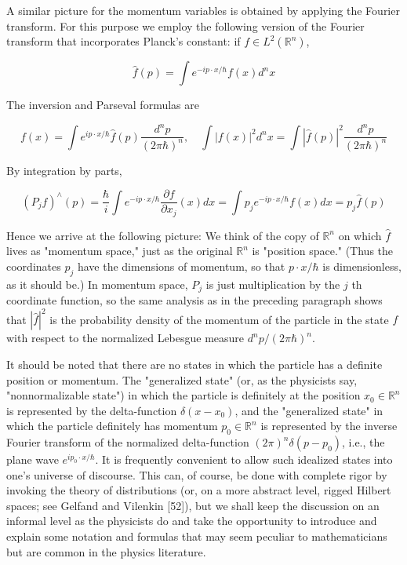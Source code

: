 \documentclass[10pt, letterpaper]{article}
\begin{document}
A similar picture for the momentum variables is obtained by applying the Fourier transform. For this purpose we employ the following version of the Fourier transform that incorporates Planck's constant: if $f \in L^{2}\left(\mathbb{R}^{n}\right)$,

$$
\widehat{f}(p)=\int e^{-i p \cdot x / \hbar} f(x) d^{n} x
$$

The inversion and Parseval formulas are

$$
f(x)=\int e^{i p \cdot x / \hbar} \widehat{f}(p) \frac{d^{n} p}{(2 \pi \hbar)^{n}}, \quad \int|f(x)|^{2} d^{n} x=\int|\widehat{f}(p)|^{2} \frac{d^{n} p}{(2 \pi \hbar)^{n}}
$$

By integration by parts,

$$
\left(P_{j} f\right)^{\wedge}(p)=\frac{\hbar}{i} \int e^{-i p \cdot x / \hbar} \frac{\partial f}{\partial x_{j}}(x) d x=\int p_{j} e^{-i p \cdot x / \hbar} f(x) d x=p_{j} \widehat{f}(p)
$$

Hence we arrive at the following picture: We think of the copy of $\mathbb{R}^{n}$ on which $\widehat{f}$ lives as "momentum space," just as the original $\mathbb{R}^{n}$ is "position space." (Thus the coordinates $p_{j}$ have the dimensions of momentum, so that $p \cdot x / \hbar$ is dimensionless, as it should be.) In momentum space, $P_{j}$ is just multiplication by the $j$ th coordinate function, so the same analysis as in the preceding paragraph shows that $|\widehat{f}|^{2}$ is the probability density of the momentum of the particle in the state $f$ with respect to the normalized Lebesgue measure $d^{n} p /(2 \pi \hbar)^{n}$.






It should be noted that there are no states in which the particle has a definite position or momentum. The "generalized state" (or, as the physicists say, "nonnormalizable state") in which the particle is definitely at the position $x_{0} \in \mathbb{R}^{n}$ is represented by the delta-function $\delta\left(x-x_{0}\right)$, and the "generalized state" in which the particle definitely has momentum $p_{0} \in \mathbb{R}^{n}$ is represented by the inverse Fourier transform of the normalized delta-function $(2 \pi)^{n} \delta\left(p-p_{0}\right)$, i.e., the plane wave $e^{i p_{0} \cdot x / \hbar}$. It is frequently convenient to allow such idealized states into one's universe of discourse. This can, of course, be done with complete rigor by invoking the theory of distributions (or, on a more abstract level, rigged Hilbert spaces; see Gelfand and Vilenkin [52]), but we shall keep the discussion on an informal level as the physicists do and take the opportunity to introduce and explain some notation and formulas that may seem peculiar to mathematicians but are common in the physics literature.
\end{document}

